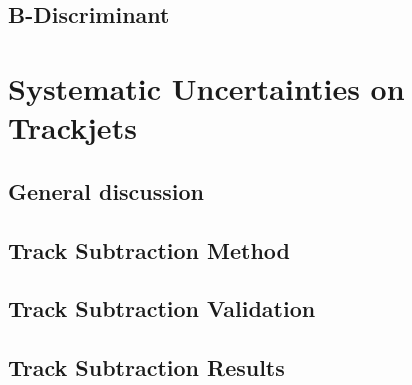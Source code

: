\subsection{B-Discriminant} %

\section{Systematic Uncertainties on Trackjets}
\subsection{General discussion}
\subsection{Track Subtraction Method} %
\subsection{Track Subtraction Validation} %
\subsection{Track Subtraction Results}

